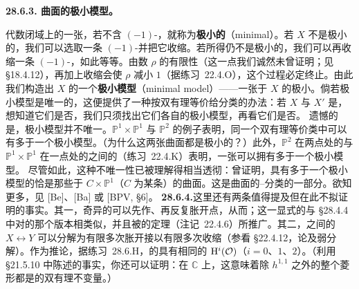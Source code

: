 \textbf{28.6.3. 曲面的极小模型。}

代数闭域上的一张\trSurface，若不含 $(-1)$-\trCurve，就称为\textbf{极小的}（minimal）。若\trSurface{} $X$ 不是极小的，我们可以选取一条 $(-1)$-\trCurve{}并把它收缩。若所得\trSurface{}仍不是极小的，我们可以再收缩一条 $(-1)$-\trCurve，如此等等。由\trPicard{}数 $\rho$ 的有限性（这一点我们诚然未曾证明；见 \S18.4.12），再加上收缩会使 $\rho$ 减小 $1$（据\mbox{练习~22.4.O}），这个过程必定终止。由此我们构造出 $X$ 的一个\textbf{极小模型}（minimal model）——一张\trBirational{}于 $X$ 的极小\trSurface。倘若极小模型是唯一的，这便提供了一种按双有理等价给\trSurface{}分类的办法：若 $X$ 与 $X'$ 是\trSmooth\trProjective{}\trSurface，想知道它们是否\trBirational，我们只须找出它们各自的极小模型，再看它们是否\trIsomorphic。
遗憾的是，极小模型并不唯一。$\mathbb{P}^1\times\mathbb{P}^1$ 与 $\mathbb{P}^2$ 的例子表明，同一个双有理等价类中可以有多于一个极小模型。（为什么这两张曲面都是极小的？）此外，$\mathbb{P}^2$ 在两点处的\trBlowup{}与 $\mathbb{P}^1\times\mathbb{P}^1$ 在一点处的\trBlowup{}之间的\trIsomorphism{}（\mbox{练习~22.4.K}）表明，一张\trSmooth\trSurface{}可以拥有多于一个极小模型。
尽管如此，这种不唯一性已被理解得相当透彻：\trZariski{}曾证明，具有多于一个极小模型的\trSurface{}恰是那些\trBirational{}于 $C\times\mathbb{P}^1$（$C$ 为某条\trCurve）的曲面。这是曲面的\trEnriques--\trKodaira{}分类的一部分。欲知更多，见 [Be]、[Ba] 或 [BPV, \S 6]。
\textbf{28.6.4.}\quad 这里还有两条值得提及但在此不拟证明的事实。其一，奇异的\trSurface{}可以先作\trNormalization、再反复胀开点，从而\trDesingularization；这一显式的\trDesingularization{}与 \S28.4.4 中对\trCurve{}的那个版本相类似，并且被\trHironaka{}的\trResolutionOfSingularities{}定理（\mbox{注记~22.4.6}）所推广。其二，\trSmooth\trSurface{}之间的\trBirational\trRationalMap{} $X\leftrightarrow Y$ 可以分解为有限多次胀开接以有限多次收缩（参看 \S22.4.12，论及弱分解）。作为推论，据\mbox{练习~28.6.H}，\trBirational{}的\trProjective{}\trSurface{}具有相同的 $\mathrm{H}^i(\mathcal{O})$（$i=0$、$1$、$2$）。（利用 \S21.5.10 中陈述的事实，你还可以证明：在 $\mathbb{C}$ 上，这意味着除 $h^{1,1}$ 之外的整个\trHodge{}菱形都是\trSurface{}的双有理不变量。）
